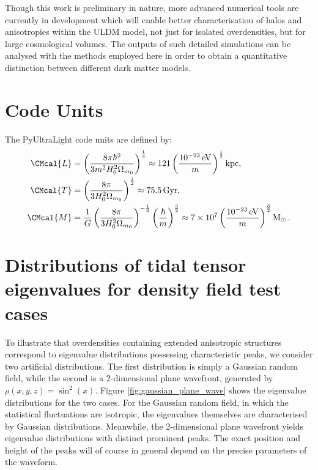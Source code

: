 \documentclass[a4paper,11pt]{article}
\begin{document}
Though this work is preliminary in nature, more advanced numerical tools are currently in development which will enable better characterisation of halos and anisotropies within the ULDM model, not just for isolated overdensities, but for large cosmological volumes. The outputs of such detailed simulations can be analysed with the methods employed here in order to obtain a quantitative distinction between different dark matter models. 











\appendix


\section{Code Units}\label{app:units}

The {\sc PyUltraLight} code units are defined by:
\begin{align}
    \CMcal{L}&=\left(\frac{8\pi\hbar^2}{3 m^2H_0^2\Omega_{m_0}}\right)^{\frac{1}{4}}\approx121\left(\frac{10^{-23}\operatorname{eV}}{m}\right)^{\frac{1}{2}}\operatorname{kpc},\label{eq:length}\\
    \CMcal{T}&=\left(\frac{8\pi}{3 H_0^2\Omega_{m_0}}\right)^{\frac{1}{2}}\approx75.5 \operatorname{Gyr},\label{eq:time}\\
    \CMcal{M}&=\frac{1}{G}\left(\frac{8\pi}{3 H_0^2\Omega_{m_0}}\right)^{-\frac{1}{4}}\left(\frac{\hbar}{m}\right)^{\frac{3}{2}}\approx 7\times 10^7\left(\frac{10^{-23}\operatorname{eV}}{m}\right)^{\frac{3}{2}}\operatorname{M}_{\odot}.\label{eq:mass}
\end{align}


\section{Distributions of tidal tensor eigenvalues for density field test cases}\label{app:prob_distro_eg}

To illustrate that overdensities containing extended anisotropic structures correspond to eigenvalue distributions possessing characteristic peaks, we consider two artificial distributions. The first distribution is simply a Gaussian random field, while the second is a 2-dimensional plane wavefront, generated by $\rho(x,y,z)=\sin^2{(x)}$. Figure \ref{fig:gaussian_plane_wave} shows the eigenvalue distributions for the two cases. For the Gaussian random field, in which the statistical fluctuations are isotropic, the eigenvalues themselves are characterised by Gaussian distributions. Meanwhile, the 2-dimensional plane wavefront yields eigenvalue distributions with distinct prominent peaks. The exact position and height of the peaks will of course in general depend on the precise parameters of the waveform.
\end{document}

